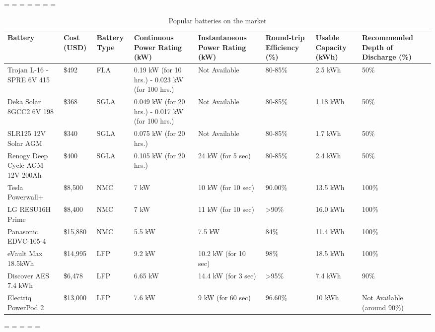 \paperwidth=\pdfpageheight
\paperheight=\pdfpagewidth
\pdfpageheight=\paperheight
\pdfpagewidth=\paperwidth
\headwidth=\textheight
\begingroup 
\vsize=\textwidth
\hsize=\textheight
\begin{table}[H]
  \centering
  \caption{Popular batteries on the market}
    \begin{tabular}{|p{6.865em}|l|p{3.09em}|p{7.725em}|p{7.635em}|l|p{6.225em}|p{8.275em}|}
    \toprule
    \textbf{Battery} & \multicolumn{1}{p{3.32em}|}{\textbf{Cost (USD)}} & \textbf{Battery Type} & \textbf{Continuous Power Rating (kW)} & \textbf{Instantaneous Power Rating (kW)} & \multicolumn{1}{p{5.865em}|}{\textbf{Round-trip Efficiency (\%)}} & \textbf{Usable Capacity (kWh)} & \textbf{Recommended Depth of Discharge (\%)} \\
    \midrule
    Trojan L-16 -SPRE 6V 415 & \$492  & FLA   & 0.19 kW (for 10 hrs.) - 0.023 kW (for 100 hrs.) & Not Available & \multicolumn{1}{p{5.865em}|}{80-85\%} & 2.5 kWh & \multicolumn{1}{l|}{50\%} \\
    \midrule
    Deka Solar 8GCC2 6V 198 & \$368  & SGLA  & 0.049 kW (for 20 hrs.) - 0.017 kW (for 100 hrs.) & Not Available & \multicolumn{1}{p{5.865em}|}{80-85\%} & 1.18 kWh & \multicolumn{1}{l|}{50\%} \\
    \midrule
    SLR125 12V Solar AGM & \$340  & SGLA  & 0.075 kW (for 20 hrs.) & Not Available & \multicolumn{1}{p{5.865em}|}{80-85\%} & 1.7 kWh & \multicolumn{1}{l|}{50\%} \\
    \midrule
    Renogy Deep Cycle AGM 12V 200Ah & \$400  & SGLA  & 0.105 kW (for 20 hrs.) & 24 kW (for 5 sec) & \multicolumn{1}{p{5.865em}|}{80-85\%} & 2.4 kWh & \multicolumn{1}{l|}{50\%} \\
    \midrule
    Tesla Powerwall+ & \$8,500  & NMC   & 7 kW  & 10 kW (for 10 sec) & 90.00\% & 13.5 kWh & \multicolumn{1}{l|}{100\%} \\
    \midrule
    LG RESU16H Prime & \$8,400  & NMC   & 7 kW  & 11 kW (for 10 sec) & \multicolumn{1}{p{5.865em}|}{>90\%} & 16.0 kWh & \multicolumn{1}{l|}{100\%} \\
    \midrule
    Panasonic EDVC-105-4 & \$15,880  & NMC   & 5.5 kW & 7.5 kW & 84\%  & 11.4 kWh & \multicolumn{1}{l|}{100\%} \\
    \midrule
    eVault Max 18.5kWh & \$14,995  & LFP   & 9.2 kW & 10.2 kW (for 10 sec) & 98\%  & 18.5 kWh & \multicolumn{1}{l|}{100\%} \\
    \midrule
    Discover AES 7.4 kWh & \$6,478  & \multicolumn{1}{l|}{LFP} & \multicolumn{1}{l|}{6.65 kW} & \multicolumn{1}{l|}{14.4 kW (for 3 sec)} & >95\% & \multicolumn{1}{l|}{7.4 kWh} & \multicolumn{1}{l|}{90\%} \\
    \midrule
    Electriq PowerPod 2 & \$13,000  & LFP   & 7.6 kW & 9 kW (for 60 sec) & 96.60\% & 10 kWh & Not Available (around 90\%) \\
    \bottomrule
    \end{tabular}%
  \label{tab:tabl2}%
\end{table}%
\endgroup
\newpage
\paperwidth=\pdfpageheight
\paperheight=\pdfpagewidth
\pdfpageheight=\paperheight
\pdfpagewidth=\paperwidth
\headwidth=\textwidth